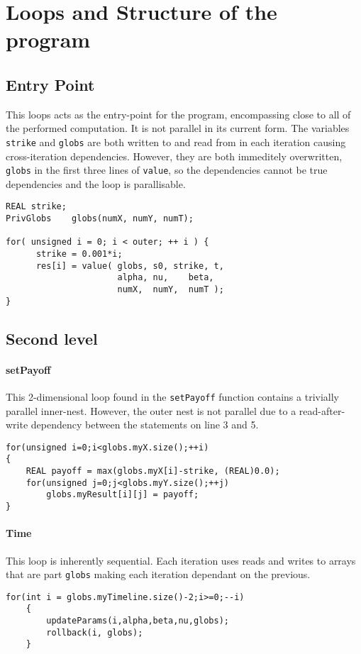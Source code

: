 \section{Loops and Structure of the program}
\subsection{Entry Point}
This loops acts as the entry-point for the program, encompassing close to all of the performed computation. It is not parallel in its
 current form. The variables \verb!strike! and \verb!globs! are both written to and read from in each iteration causing cross-iteration
 dependencies. However, they are both immeditely overwritten, \verb!globs! in the first three lines of \verb!value!, so the dependencies
 cannot be true dependencies and the loop is parallisable.
\begin{lstlisting}[caption=Outermost loop, label=outerloop]
REAL strike;
PrivGlobs    globs(numX, numY, numT);

for( unsigned i = 0; i < outer; ++ i ) {
      strike = 0.001*i;
      res[i] = value( globs, s0, strike, t,
                      alpha, nu,    beta,
                      numX,  numY,  numT );
}
\end{lstlisting}

\subsection{Second level}

\paragraph{setPayoff}
This 2-dimensional loop found in the \verb!setPayoff! function contains a trivially parallel inner-nest.
 However, the outer nest is not parallel due to a read-after-write
 dependency between the statements on line 3 and 5.
\begin{lstlisting}[caption=setPayoff() loop, label=payoffloop]
for(unsigned i=0;i<globs.myX.size();++i)
{
	REAL payoff = max(globs.myX[i]-strike, (REAL)0.0);
	for(unsigned j=0;j<globs.myY.size();++j)
		globs.myResult[i][j] = payoff;
}
\end{lstlisting}

\paragraph{Time}
This loop is inherently sequential. Each iteration uses reads and writes to arrays that are part \verb!globs! making
 each iteration dependant on the previous.
\begin{lstlisting}[caption=Timeline loop, label=timeloop]
for(int i = globs.myTimeline.size()-2;i>=0;--i)
    {
        updateParams(i,alpha,beta,nu,globs);
        rollback(i, globs);
    }
\end{lstlisting}

